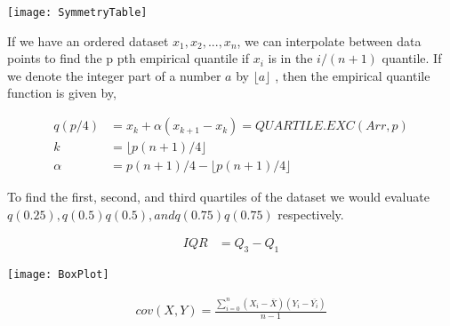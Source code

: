 {

    \vspace*{.1in}
    \texttt{[image: SymmetryTable]}
}


{

    If we have an ordered dataset $ x_{1},x_{2},...,x_{n}$, we can interpolate
    between data points to find the p pth empirical quantile if $x_{i}$ is in
    the ${\displaystyle i/(n+1)}$ quantile. If we denote the integer part of a
    number $a$ by $\lfloor a\rfloor$ , then the empirical quantile function is
    given by,

    \begin{align*}
        q(p/4) &= x_k + \alpha ( x_{k + 1} - x_k ) = QUARTILE.EXC(Arr, p) \\
        k &=\lfloor p(n+1)/4\rfloor \\
        \alpha &=p(n+1)/4-\lfloor p(n+1)/4\rfloor
    \end{align*}

    To find the first, second, and third quartiles of the dataset we would
    evaluate $q(0.25), q ( 0.5 ) q(0.5), and q ( 0.75 ) q(0.75)$ respectively. 

}

{
    \begin{align*}
        IQR &= Q_3-Q_1
    \end{align*}
}


{
    \vspace*{.1in}
    \texttt{[image: BoxPlot]}
}

{
    \begin{align*}
        cov(X,Y) = \frac{\sum_{i=0}^{n} (X_i-\overline{X})(Y_i-\overline{Y_i})}{n-1}
    \end{align*}
}
